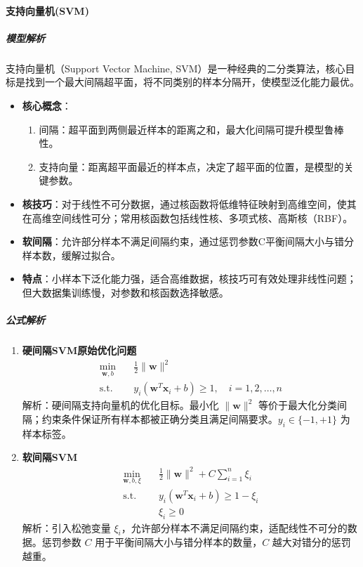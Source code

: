 \documentclass[12pt]{article}
\begin{document}
\paragraph{支持向量机(SVM)}
\subparagraph{模型解析}
支持向量机（Support Vector Machine, SVM）是一种经典的二分类算法，核心目标是找到一个最大间隔超平面，将不同类别的样本分隔开，使模型泛化能力最优。
\begin{itemize}
    \item \textbf{核心概念}：
    \begin{enumerate}
        \item 间隔：超平面到两侧最近样本的距离之和，最大化间隔可提升模型鲁棒性。
        \item 支持向量：距离超平面最近的样本点，决定了超平面的位置，是模型的关键参数。
    \end{enumerate}
    \item \textbf{核技巧}：对于线性不可分数据，通过核函数将低维特征映射到高维空间，使其在高维空间线性可分；常用核函数包括线性核、多项式核、高斯核（RBF）。
    \item \textbf{软间隔}：允许部分样本不满足间隔约束，通过惩罚参数C平衡间隔大小与错分样本数，缓解过拟合。
    \item \textbf{特点}：小样本下泛化能力强，适合高维数据，核技巧可有效处理非线性问题；但大数据集训练慢，对参数和核函数选择敏感。
\end{itemize}

\subparagraph{公式解析}
\begin{enumerate}
    \item \textbf{硬间隔SVM原始优化问题}
    \[
    \begin{aligned}
    \min_{\boldsymbol{w}, b} \quad & \frac{1}{2} \| \boldsymbol{w} \|^2 \\
    \text{s.t.} \quad & y_i (\boldsymbol{w}^T \boldsymbol{x}_i + b) \geq 1,\quad i=1,2,\dots,n
    \end{aligned}
    \]
    解析：硬间隔支持向量机的优化目标。最小化 $\|\boldsymbol{w}\|^2$ 等价于最大化分类间隔；约束条件保证所有样本都被正确分类且满足间隔要求。$y_i\in\{-1,+1\}$ 为样本标签。

    \item \textbf{软间隔SVM}
    \[
    \begin{aligned}
    \min_{\boldsymbol{w}, b, \xi} \quad & \frac{1}{2} \| \boldsymbol{w} \|^2 + C \sum_{i=1}^n \xi_i \\
    \text{s.t.} \quad & y_i (\boldsymbol{w}^T \boldsymbol{x}_i + b) \geq 1 - \xi_i \\
    & \xi_i \geq 0
    \end{aligned}
    \]
    解析：引入松弛变量 $\xi_i$，允许部分样本不满足间隔约束，适配线性不可分的数据。惩罚参数 $C$ 用于平衡间隔大小与错分样本的数量，$C$ 越大对错分的惩罚越重。
\end{enumerate}
\end{document}
